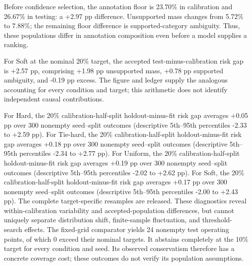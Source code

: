 Before confidence selection, the annotation floor is 23.70\% in calibration and 26.67\% in testing: a +2.97 pp difference. Unsupported mass changes from 5.72\% to 7.88\%; the remaining floor difference is supported-category ambiguity. Thus, these populations differ in annotation composition even before a model supplies a ranking.

For Soft at the nominal 20\% target, the accepted test-minus-calibration risk gap is +2.57 pp, comprising +1.98 pp unsupported mass, +0.78 pp supported ambiguity, and -0.19 pp excess. The figure and ledger supply the analogous accounting for every condition and target; this arithmetic does not identify independent causal contributions.

For Hard, the 20\% calibration-half-split holdout-minus-fit risk gap averages +0.05 pp over 300 nonempty seed--split outcomes (descriptive 5th--95th percentiles -2.33 to +2.59 pp). For Tie-hard, the 20\% calibration-half-split holdout-minus-fit risk gap averages +0.18 pp over 300 nonempty seed--split outcomes (descriptive 5th--95th percentiles -2.34 to +2.77 pp). For Uniform, the 20\% calibration-half-split holdout-minus-fit risk gap averages +0.19 pp over 300 nonempty seed--split outcomes (descriptive 5th--95th percentiles -2.02 to +2.62 pp). For Soft, the 20\% calibration-half-split holdout-minus-fit risk gap averages +0.17 pp over 300 nonempty seed--split outcomes (descriptive 5th--95th percentiles -2.00 to +2.43 pp). The complete target-specific resamples are released. These diagnostics reveal within-calibration variability and accepted-population differences, but cannot uniquely separate distribution shift, finite-sample fluctuation, and threshold-search effects.
The fixed-grid comparator yields 24 nonempty test operating points, of which 0 exceed their nominal targets. It abstains completely at the 10\% target for every condition and seed. Its observed conservatism therefore has a concrete coverage cost; these outcomes do not verify its population assumptions.

